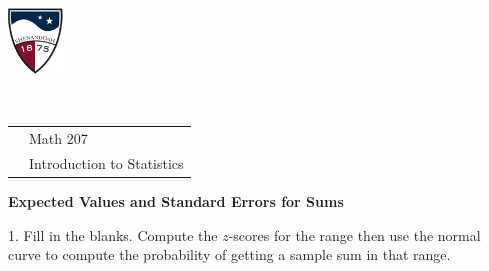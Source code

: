 \documentclass[10pt]{article}
\begin{document}
\pagestyle{empty}
\lstset{language=R, showspaces=false, showstringspaces=false}
\href{http://www.su.edu}{\includegraphics[height=1.75cm]{sulogo.eps}}
\vspace{-1.79cm}

{{\ }\hfill\small
\begin{tabular}{cl}
& Math 207\\
& Introduction to Statistics\\
\end{tabular}
}

\setlength{\baselineskip}{1.05\baselineskip}
\medskip

\begin{center}
\textbf{\large  Expected Values and Standard Errors for Sums}
\end{center}

\newcommand{\HH}{\hspace{20pt}\hphantom{a) } }
%
\newcommand{\twobox}[2]{\begin{pspicture}(-0.3,0.2)(2,1.3)
\psframe(0,0)(0.7,0.7)\rput(0.35,0.35){#1}
\psframe(1,0)(1.7,0.7)\rput(1.35,0.35){#2}
\psline(-0.3,0.9)(-0.3,-0.2)(2,-0.2)(2,0.9)(-0.3,0.9)
\end{pspicture}}
%
\newcommand{\threebox}[3]{\begin{pspicture}(0.2,0.2)(2.5,1.3)
\psframe(0,0)(0.7,0.7)\rput(0.35,0.35){#1}
\psframe(1,0)(1.7,0.7)\rput(1.35,0.35){#2}
\psframe(2,0)(2.7,0.7)\rput(2.35,0.35){#3}
\psline(-0.3,0.9)(-0.3,-0.2)(3,-0.2)(3,0.9)(-0.3,0.9)
\end{pspicture}}


1. Fill in the blanks. Compute the $z$-scores for the range then use
the normal curve to compute the probability of getting a sample sum
in that range.
\vspace{-5pt}
\end{document}
